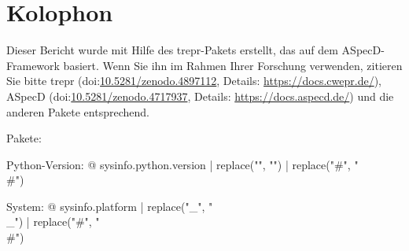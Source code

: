 \section*{Kolophon}

Dieser Bericht wurde mit Hilfe des trepr-Pakets erstellt, das auf dem ASpecD-Framework basiert. Wenn Sie ihn im Rahmen Ihrer Forschung verwenden, zitieren Sie bitte trepr (doi:\href{https://doi.org/10.5281/zenodo.4897112}{10.5281/zenodo.4897112}, Details: \url{https://docs.cwepr.de/}), ASpecD (doi:\href{https://doi.org/10.5281/zenodo.4717937}{10.5281/zenodo.4717937}, Details: \url{https://docs.aspecd.de/}) und die anderen Pakete entsprechend.

Pakete: %


Python-Version: {@ sysinfo.python.version | replace("\n", "") | replace("#", "\\#") }

System: {@ sysinfo.platform | replace("_", "\\_") | replace("#", "\\#") }
